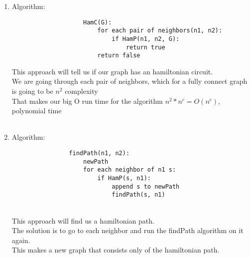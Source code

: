 \documentclass[11pt]{article}
\begin{document}
\begin{enumerate}
    \item Algorithm:
        \begin{verbatim}
                    HamC(G):
                        for each pair of neighbors(n1, n2):
                            if HamP(n1, n2, G):
                                return true
                        return false
                    \end{verbatim}

                    This approach will tell us if our graph has an hamiltonian circuit. \\
                    We are going through each pair of neighbors, which for a fully connect graph is going to be $n^2$ complexity\\
                    That makes our big O run time for the algorithm $n^2 * n^c = O(n^c)$, polynomial time\\
                    \\
                \item
                    Algorithm:
                    \begin{verbatim}
                findPath(n1, n2):
                    newPath
                    for each neighbor of n1 s:
                        if HamP(s, n1):
                            append s to newPath
                            findPath(s, n1)
               \end{verbatim}\\

               This approach will find us a hamiltonian path.\\
               The solution is to go to each neighbor and run the findPath algorithm on it again. \\
               This makes a new graph that consists only of the hamiltonian path.\\

       \end{enumerate}

       
\end{document}
